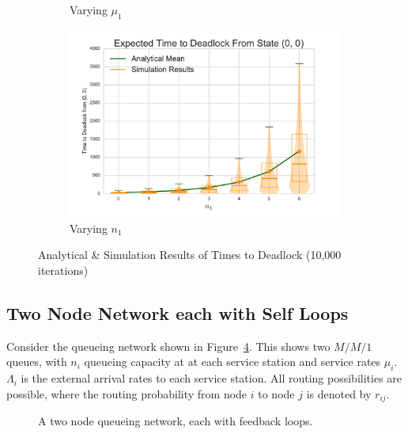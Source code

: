 \documentclass{article}
\begin{document}
\begin{figure}[H]
\begin{subfigure}[b]{0.5\textwidth}
  \caption{Varying $\mu_1$}
  \label{fig:timestodeadlock2_mu1}
\end{subfigure}
\begin{subfigure}[b]{0.5\textwidth}
  \includegraphics[width=\textwidth]{images/varyn1}
  \caption{Varying $n_1$}
  \label{fig:timestodeadlock2_n1}
\end{subfigure}
\caption{Analytical \& Simulation Results of Times to Deadlock (10,000 iterations)}
\label{fig:timestodeadlock2}
\end{figure}


\subsection{Two Node Network each with Self Loops}\label{sec:2nodeselfloops}
Consider the queueing network shown in Figure~\ref{fig:queueingnetwork_2nodesfeedback}.
This shows two \(M/M/1\) queues, with \(n_i\) queueing capacity at at each service station and service rates $\mu_i$.
$\Lambda_i$ is the external arrival rates to each service station.
All routing possibilities are possible, where the routing probability from node $i$ to node $j$ is denoted by $r_{ij}$.

\begin{figure}[H]
  
  \caption{A two node queueing network, each with feedback loops.}
  \label{fig:queueingnetwork_2nodesfeedback}
\end{figure}
\end{document}
